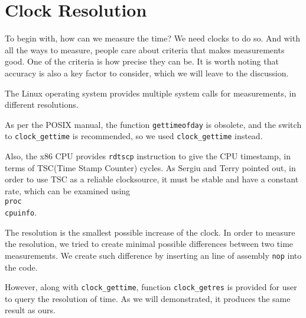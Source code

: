 \section{Clock Resolution}

To begin with, how can we measure the time? We need clocks to do so. And with all the ways to measure, people care about criteria that makes measurements good. One of the criteria is how precise they can be. It is worth noting that accuracy is also a key factor to consider, which we will leave to the discussion.

The Linux operating system provides multiple system calls for measurements, in different resolutions.

As per the POSIX manual\cite{posix_clock_gettime}, the function \texttt{gettimeofday} is obsolete, and the switch to \texttt{clock\_gettime} is recommended, so we used \texttt{clock\_gettime} instead.

Also, the x86 CPU provides \texttt{rdtscp} instruction to give the CPU timestamp, in terms of TSC(Time Stamp Counter) cycles. As Sergiu and Terry pointed out, in order to use TSC as a reliable clocksource, it must be stable and have a constant rate, which can be examined using \texttt{\\proc\\cpuinfo}\cite{constant_tsc}.

The resolution is the smallest possible increase of the clock. In order to measure the resolution, we tried to create minimal possible differences between two time measurements. We create such difference by inserting an line of assembly \texttt{nop} into the code.

However, along with \texttt{clock\_gettime}, function \texttt{clock\_getres} is provided for user to query the resolution of time. As we will demonstrated, it produces the same result as ours.